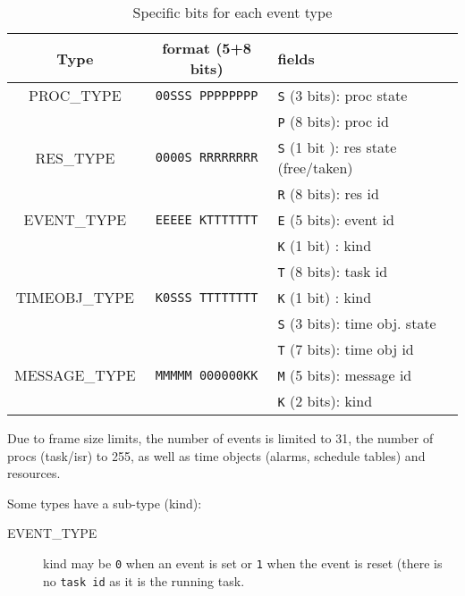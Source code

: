 \begin{table}[htbp]
	\begin{longtable}[c]{c|c|l}
		\bf Type & \bf format (5+8 bits) & \bf fields \\ \hline
		PROC\_TYPE    & \texttt{00SSS PPPPPPPP} & \texttt{S} (3 bits): proc state      \\
		              &                         & \texttt{P} (8 bits): proc id         \\ \hline
		RES\_TYPE     & \texttt{0000S RRRRRRRR} & \texttt{S} (1 bit ): res state (free/taken)       \\
		              &                         & \texttt{R} (8 bits): res id          \\ \hline
		EVENT\_TYPE   & \texttt{EEEEE KTTTTTTT} & \texttt{E} (5 bits): event id        \\
		              &                         & \texttt{K} (1 bit) : kind            \\ 
		              &                         & \texttt{T} (8 bits): task id         \\ \hline
		TIMEOBJ\_TYPE & \texttt{K0SSS TTTTTTTT} & \texttt{K} (1 bit) : kind            \\
		              &                         & \texttt{S} (3 bits): time obj. state \\
		              &                         & \texttt{T} (7 bits): time obj id     \\ \hline
		MESSAGE\_TYPE & \texttt{MMMMM 000000KK} & \texttt{M} (5 bits): message id      \\
	                  &                         & \texttt{K} (2 bits): kind            \\ \hline
	\end{longtable}
	\caption{Specific bits for each event type}
	\label{tab:traceBin}
\end{table}


Due to frame size limits, the number of events is limited to 31, the number of procs (task/isr) to 255, as well as time objects (alarms, schedule tables) and resources.

Some types have a sub-type (kind):
\begin{description}
	\item[EVENT\_TYPE] kind may be \texttt{0} when an event is set or \texttt{1} when the event is reset (there is no \texttt{task id} as it is the running task. 
\end{description}


